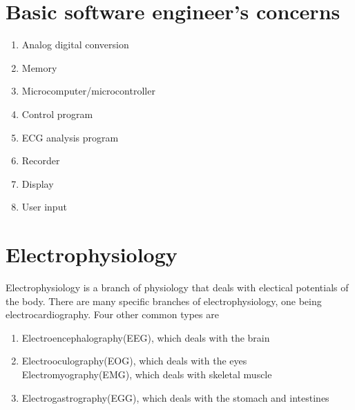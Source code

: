 \documentclass[11pt]{book}
\begin{document}
\section{Basic software engineer's concerns}
\begin{enumerate}
	\item Analog digital conversion
	\item Memory
	\item Microcomputer/microcontroller
	\item Control program
	\item ECG analysis program
	\item Recorder
	\item Display
	\item User input
\end{enumerate}

\section{Electrophysiology}
Electrophysiology is a branch of physiology that deals with electical potentials of the body.
There are many specific branches of electrophysiology, one being electrocardiography. Four other common types are
\begin{enumerate}
	\item Electroencephalography(EEG), which deals with the brain
	\item Electrooculography(EOG), which deals with the eyes
	\iteam Electromyography(EMG), which deals with skeletal muscle
	\item Electrogastrography(EGG), which deals with the stomach and intestines
\end{enumerate}
\end{document}
